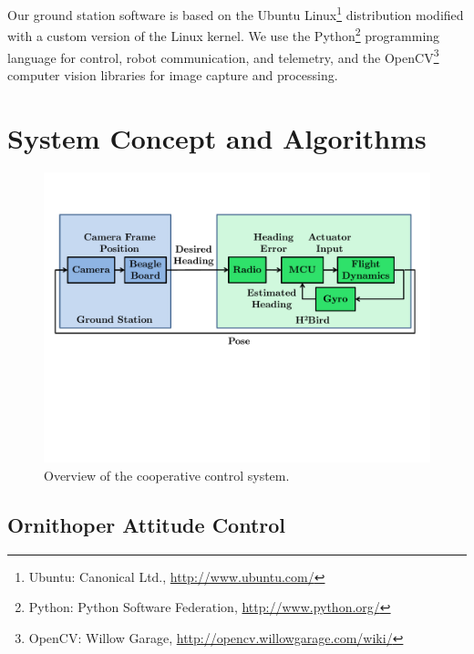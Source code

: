 \documentclass{aamas2013}
\begin{document}
Our ground station software is based on the Ubuntu Linux\footnote{\raggedright Ubuntu: 
Canonical Ltd., \href{http://www.ubuntu.com/}{http://www.ubuntu.com/}} distribution
modified with a custom version of the Linux kernel. 
We use the Python\footnote{\raggedright Python: Python Software Federation, \href{http://www.python.org/}
{http://www.python.org/}} programming language for control, robot 
communication, and telemetry, and the OpenCV\footnote{\raggedright OpenCV: Willow Garage, 
\href{http://opencv.willowgarage.com/wiki/}{http://opencv.willowgarage.com/wiki/}} 
computer vision libraries for image capture and processing.
\section{System Concept and Algorithms}

\begin{figure}[tb]
\centering
\includegraphics[width=\linewidth]{figures/process_flow.pdf}
\caption{Overview of the cooperative control system.}
\label{fig:process_flow}
\end{figure}

\subsection{Ornithoper Attitude Control}
\end{document}
